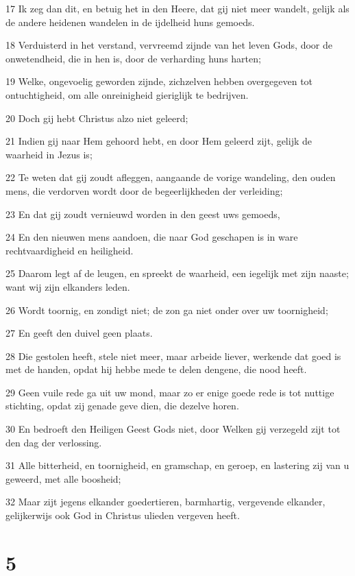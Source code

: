\par 17 Ik zeg dan dit, en betuig het in den Heere, dat gij niet meer wandelt, gelijk als de andere heidenen wandelen in de ijdelheid huns gemoeds.
\par 18 Verduisterd in het verstand, vervreemd zijnde van het leven Gods, door de onwetendheid, die in hen is, door de verharding huns harten;
\par 19 Welke, ongevoelig geworden zijnde, zichzelven hebben overgegeven tot ontuchtigheid, om alle onreinigheid gieriglijk te bedrijven.
\par 20 Doch gij hebt Christus alzo niet geleerd;
\par 21 Indien gij naar Hem gehoord hebt, en door Hem geleerd zijt, gelijk de waarheid in Jezus is;
\par 22 Te weten dat gij zoudt afleggen, aangaande de vorige wandeling, den ouden mens, die verdorven wordt door de begeerlijkheden der verleiding;
\par 23 En dat gij zoudt vernieuwd worden in den geest uws gemoeds,
\par 24 En den nieuwen mens aandoen, die naar God geschapen is in ware rechtvaardigheid en heiligheid.
\par 25 Daarom legt af de leugen, en spreekt de waarheid, een iegelijk met zijn naaste; want wij zijn elkanders leden.
\par 26 Wordt toornig, en zondigt niet; de zon ga niet onder over uw toornigheid;
\par 27 En geeft den duivel geen plaats.
\par 28 Die gestolen heeft, stele niet meer, maar arbeide liever, werkende dat goed is met de handen, opdat hij hebbe mede te delen dengene, die nood heeft.
\par 29 Geen vuile rede ga uit uw mond, maar zo er enige goede rede is tot nuttige stichting, opdat zij genade geve dien, die dezelve horen.
\par 30 En bedroeft den Heiligen Geest Gods niet, door Welken gij verzegeld zijt tot den dag der verlossing.
\par 31 Alle bitterheid, en toornigheid, en gramschap, en geroep, en lastering zij van u geweerd, met alle boosheid;
\par 32 Maar zijt jegens elkander goedertieren, barmhartig, vergevende elkander, gelijkerwijs ook God in Christus ulieden vergeven heeft.

\chapter{5}

